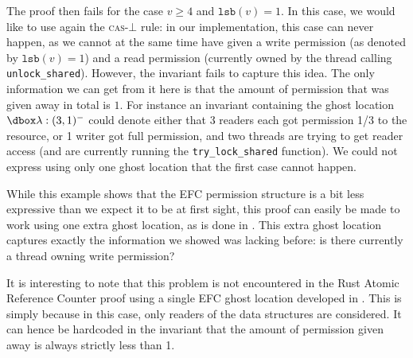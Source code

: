 The proof then fails for the case $v \ge 4$ and $\texttt{lsb}(v) = 1$. In this case, we would like to use again the \textsc{cas}-$\bot$ rule: in our implementation, this case can never happen, as we cannot at the same time have given a write permission (as denoted by $\texttt{lsb}(v) = 1$) and a read permission (currently owned by the thread calling \texttt{unlock\_shared}). However, the invariant fails to capture this idea. The only information we can get from it here is that the amount of permission that was given away in total is $1$. For instance an invariant containing the ghost location $\ghost{\lambda:(3, 1)^-}$ could denote either that 3 readers each got permission 1/3 to the resource, or 1 writer got full permission, and two threads are trying to get reader access (and are currently running the \texttt{try\_lock\_shared} function). We could not express using only one ghost location that the first case cannot happen.

While this example shows that the EFC permission structure is a bit less expressive than we expect it to be at first sight, this proof can easily be made to work using one extra ghost location, as is done in \cite{gaurav}. This extra ghost location captures exactly the information we showed was lacking before: is there currently a thread owning write permission?

It is interesting to note that this problem is not encountered in the Rust Atomic Reference Counter proof using a single EFC ghost location developed in \cite{gaurav}. This is simply because in this case, only readers of the data structures are considered. It can hence be hardcoded in the invariant that the amount of permission given away is always strictly less than 1.


